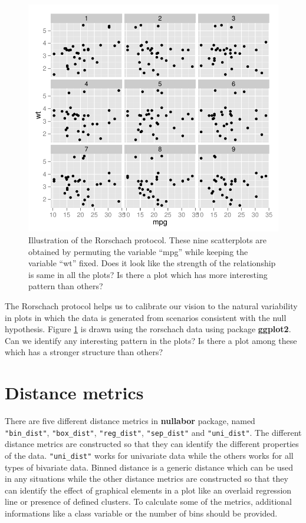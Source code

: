 \begin{figure}[hbtp]
\begin{center}
\includegraphics[scale=1]{nullabor-rorschach.pdf}
\caption{Illustration of the Rorschach protocol. These nine scatterplots are obtained by permuting the variable ``mpg'' while keeping the variable ``wt'' fixed. Does it look like the strength of the relationship is same in all the plots? Is there a plot which has more interesting pattern than others? }
\label{rorschach}
\end{center}
\end{figure}

The Rorschach protocol helps us to calibrate our vision to the natural variability in plots in which the data is generated from scenarios consistent with the null hypothesis. Figure \ref{rorschach} is drawn using the rorschach data using package \textbf{ggplot2}. Can we identify any interesting pattern in the plots? Is there a plot among these which has a stronger structure than others?

\section{Distance metrics}\label{distance-metrics}

There are five different distance metrics in \textbf{nullabor} package,
named \texttt{"bin\_dist"}, \texttt{"box\_dist"}, \texttt{"reg\_dist"},
\texttt{"sep\_dist"} and \texttt{"uni\_dist"}. The different distance
metrics are constructed so that they can identify the different
properties of the data. \texttt{"uni\_dist"} works for univariate data
while the others works for all types of bivariate data. Binned distance
is a generic distance which can be used in any situations while the
other distance metrics are constructed so that they can identify the
effect of graphical elements in a plot like an overlaid regression line
or presence of defined clusters. To calculate some of the metrics,
additional informations like a class variable or the number of bins
should be provided.

